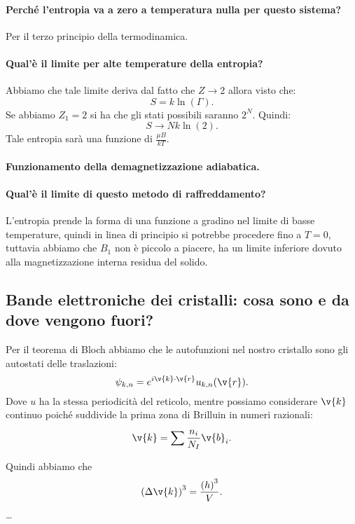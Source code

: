 \paragraph{Perché l'entropia va a zero a temperatura nulla per questo sistema?}%
\label{par:Perché l'entropia va a zero a temperatura nulla per questo sistema?}
Per il terzo principio della termodinamica.
\paragraph{Qual'è il limite per alte temperature della entropia?}%
\label{par:Qual'è il limite per alte temperature della entropia?}
Abbiamo che tale limite deriva dal fatto che $Z\to 2$  allora visto che:
\[
    S = k\ln (\Gamma) 
.\] 
Se abbiamo $Z_1=2$  si ha che gli stati possibili saranno $2^N$. Quindi:
\[
    S \to Nk\ln (2) 
.\] 
Tale entropia sarà una funzione di $\frac{\mu B}{kT}$.
\paragraph{Funzionamento della demagnetizzazione adiabatica.}%
\label{par:Funzionamento della demagnetizzazione adiabatica.}
\paragraph{Qual'è il limite di questo metodo di raffreddamento?}%
\label{par:Qual'è il limite di questo metodo di raffreddamento?}
L'entropia prende la forma di una funzione a gradino nel limite di basse temperature, quindi in linea di principio si potrebbe procedere fino a $T=0$, tuttavia abbiamo che $B_1$  non è piccolo a piacere, ha un limite inferiore dovuto alla magnetizzazione interna residua del solido.
\subsection{Bande elettroniche dei cristalli: cosa sono e da dove vengono fuori?}%
\label{sub:Bande elettroniche dei cristalli: cosa sono e da dove vengono fuori?}
Per il teorema di Bloch abbiamo che le autofunzioni nel nostro cristallo sono gli autostati delle traslazioni:
\[
    \psi_{k,n}=e^{i\v{k}\cdot \v{r}}u_{k,n}(\v{r}) 
.\] 
Dove $u$ ha la stessa periodicità del reticolo, mentre possiamo considerare $\v{k}$ continuo poiché suddivide la prima zona di Brilluin in numeri razionali:
\[
    \v{k}= \sum_{}^{} \frac{n_i}{N_I}\v{b}_i
.\] 
Quindi abbiamo che 
\[
    \left(\Delta\v{k}\right)^3 = \frac{\left(h\right)^3}{V}
.\] 
\ldots\\
